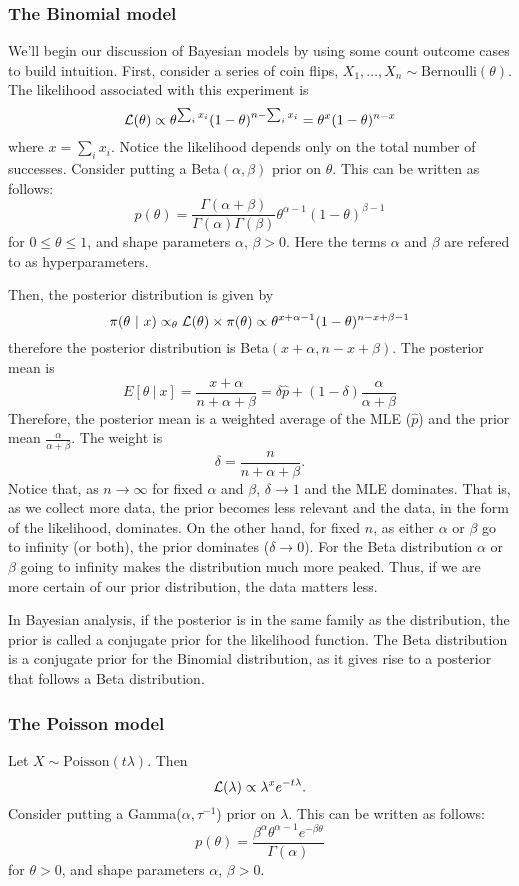 \subsubsection{The Binomial model}
We'll begin our discussion of Bayesian models by using some count outcome cases to build 
intuition. First, consider a series of coin flips, $X_1, \ldots, X_n \sim \mbox{Bernoulli}(\theta)$.
The likelihood associated with this experiment is
$$
{\cal L}(\theta) \propto \theta^{\sum_i x_i} (1 - \theta)^{n-\sum_i x_i} = \theta^x (1 - \theta)^{n-x}
$$
where $x = \sum_i x_i$. Notice the likelihood depends only on the total number of successes.
Consider putting a Beta$(\alpha, \beta)$ prior on $\theta$. 
This can be written as follows:
$$
p(\theta) = \frac{\Gamma(\alpha + \beta)}{\Gamma(\alpha) \Gamma(\beta)} \theta^{\alpha-1} (1- \theta)^{\beta-1}
$$
for $0 \le \theta \le 1$, and shape parameters $\alpha$, $\beta > 0$.
Here the terms $\alpha$ and $\beta$ are refered to as hyperparameters.

Then, the posterior distribution is given by
$$
\pi(\theta ~|~ x) \propto_\theta {\cal L}(\theta) \times \pi(\theta) \propto \theta^{x + \alpha - 1} (1 - \theta)^{n - x + \beta - 1}
$$
therefore the posterior distribution is Beta$(x + \alpha, n - x + \beta)$. The posterior mean is
$$
E[\theta ~|~ x] = \frac{x + \alpha}{n + \alpha + \beta} 
= \delta \hat p + (1 - \delta) \frac{\alpha}{\alpha + \beta}
$$
Therefore, the posterior mean is a weighted average of the MLE ($\hat p$) and the prior
mean $\frac{\alpha}{\alpha + \beta}$. The weight is 
$$
\delta = \frac{n}{n + \alpha + \beta}.
$$
Notice that, as $n \rightarrow \infty$ for fixed $\alpha$ and $\beta$, $\delta \rightarrow 1$ and
the MLE
dominates. That is, as we collect more data, the prior becomes less relevant
and the data, in the form of the likelihood, dominates. On the other hand,
for fixed $n$, as either $\alpha$ or $\beta$ go to infinity (or both), the prior
dominates ($\delta \rightarrow 0$). For the Beta distribution $\alpha$ or $\beta$ going to infinity makes
the distribution much more peaked. Thus, if we are more certain of our prior
distribution, the data matters less. 

In Bayesian analysis, if the posterior is in the same family as the distribution, the prior is called a conjugate prior for the likelihood function. 
The Beta distribution is a conjugate prior for the Binomial distribution, as it gives rise to a posterior that follows a Beta distribution.

\subsubsection{The Poisson model}
Let $X \sim \mbox{Poisson}(t\lambda)$. Then 
$$
{\cal L}(\lambda) \propto \lambda^x e^{-t \lambda}.
$$
Consider putting a Gamma($\alpha, \tau^{-1}$) prior on $\lambda$. This can be written as follows:
$$
p(\theta) = \frac{\beta^\alpha \theta^{\alpha-1} e^{-\beta \theta}}{\Gamma(\alpha)}
$$
for $\theta >0 $, and shape parameters $\alpha$, $\beta > 0$.

